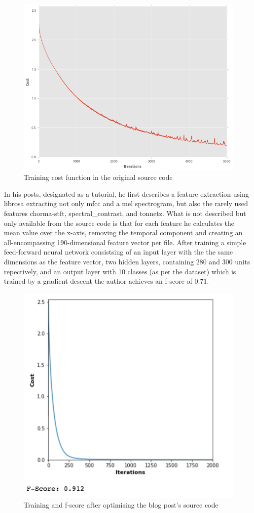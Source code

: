 \begin{figure}
    \centering
	\includegraphics[width=.5\textwidth]{./images/illustrations/urban-sound-nn-cost}
    \caption{Training cost function in the original source code}
    \label{fig:aqibsaeed}
\end{figure}


In his posts, designated as a tutorial, he first describes a feature extraction using librosa extracting not only mfcc and a mel spectrogram, but also the rarely used features chorma-stft, spectral_contrast, and tonnetz. What is not described but only available from the source code is that for each feature he calculates the mean value over the x-axis, removing the temporal component and creating an all-encompassing 190-dimensional feature vector per file. After training a simple feed-forward neural network consistsing of an input layer with the the same dimensions as the feature vector, two hidden layers, containing 280 and 300 units repectively, and an output layer with 10 classes (as per the dataset) which is trained by a gradient descent the author achieves an f-score of 0.71.

\begin{figure}
    \centering
	\includegraphics[width=.5\textwidth]{./images/illustrations/aquibsaeed-optimized}
    \caption{Training and f-score after optimising the blog post's source code}
    \label{fig:aqibsaeed}
\end{figure}


